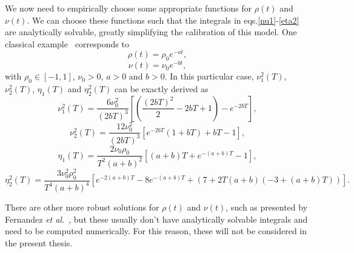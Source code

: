 We now need to empirically choose some appropriate functions for $\rho(t)$ and $\nu(t)$.
We can choose these functions such that the integrals in eqs.\eqref{nu1}-\eqref{eta2} are analytically  solvable, greatly simplifying the calibration of this model.
One classical example~\cite{Fernandez} corresponds to
\begin{equation}\label{rhot}
\rho(t)=\rho_0e^{-at},
\end{equation}
\begin{equation}\label{nut}
\nu(t)=\nu_0e^{-bt},
\end{equation}
\noindent with $\rho_0\in[-1,1]$, $\nu_0>0$, $a>0$ and $b>0$.
In this particular case, $\nu_1^2(T)$, $\nu_2^2(T)$, $\eta_1(T)$ and $\eta_2^2(T)$ can be exactly derived as
\begin{equation}
\nu_1^2(T)=\frac{6\nu_0^2}{(2bT)^3}\left[\left(\frac{(2bT)^2}{2}-2bT+1\right)-e^{-2bT}\right],
\end{equation}
\begin{equation}
\nu_2^2(T)=\frac{12\nu_0^2}{(2bT)^3}\left[e^{-2bT}(1+bT)+bT-1\right],
\end{equation}
\begin{equation}
\eta_1(T)=\frac{2\nu_0\rho_0}{T^2(a+b)^2}\left[(a+b)T+e^{-(a+b)T}-1\right],
\end{equation}
\begin{equation}
\eta_2^2(T)=\frac{3\nu_0^2\rho_0^2}{T^4(a+b)^4}\left[e^{-2(a+b)T}-8e^{-(a+b)T}+(7+2T(a+b)(-3+(a+b)T))\right].
\end{equation}

There are other more robust solutions for $\rho(t)$ and $\nu(t)$, such as presented by Fernandez \textit{et al.}~\cite{Fernandez}, but these usually don't have analytically solvable integrals and need to be computed numerically. For this reason, these will not be considered in the present thesis.

\iffalse
Despite their analytically solvable integrals, these formulas may not be robust enough to appropriately fit large data sets. Other more robust examples are
\begin{equation}\label{rhot2}
\rho(t)=(\rho_0+q_\rho t)e^{-at}+d_\rho,
\end{equation}
\begin{equation}\label{nut2}
\nu(t)=(\nu_0+q_\nu t)e^{-bt}+d_\nu,
\end{equation}
\noindent where we have now introduced new parameters $q_\rho$, $d_\rho$, $q_\nu$ and $d_\nu$.
The main problem with these more robust formulas is the increased number of parameters, which makes the calibration procedure much more complex. Furthermore, the integral in eq.\eqref{eta2} is not analytically solvable, and must be calculated numerically, which further complicates the calibration.

Both examples shown before will be analyzed in later chapters. 
\fi